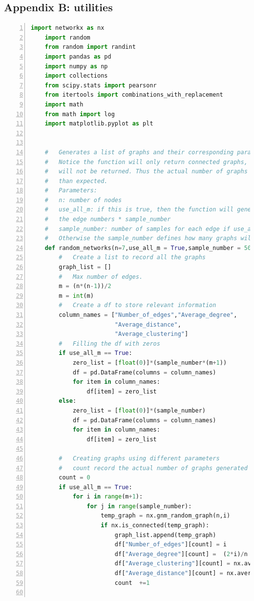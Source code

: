 \documentclass[12pt]{article}
\begin{document}
\subsection{Appendix B: utilities}
\begin{lstlisting}[numbers=left,language=Python,breaklines=true]
    import networkx as nx
    import random
    from random import randint
    import pandas as pd
    import numpy as np
    import collections
    from scipy.stats import pearsonr
    from itertools import combinations_with_replacement
    import math
    from math import log
    import matplotlib.pyplot as plt
    
    
    #   Generates a list of graphs and their corresponding parameter.
    #   Notice the function will only return connected graphs, disconnected graphs
    #   will not be returned. Thus the actual number of graphs returned will be less
    #   than expected.
    #   Parameters:
    #   n: number of nodes
    #   use_all_m: if this is true, then the function will generates samples using all
    #   the edge numbers * sample_number
    #   sample_number: number of samples for each edge if use_all_m = True
    #   Otherwise the sample_number defines how many graphs will be returned in total
    def random_networks(n=7,use_all_m = True,sample_number = 50):
        #   Create a list to record all the graphs
        graph_list = []
        #   Max number of edges.
        m = (n*(n-1))/2
        m = int(m)
        #   Create a df to store relevant information
        column_names = ["Number_of_edges","Average_degree",
                        "Average_distance",
                        "Average_clustering"]
        #   Filling the df with zeros
        if use_all_m == True:
            zero_list = [float(0)]*(sample_number*(m+1))
            df = pd.DataFrame(columns = column_names)
            for item in column_names:
                df[item] = zero_list 
        else:
            zero_list = [float(0)]*(sample_number)
            df = pd.DataFrame(columns = column_names)
            for item in column_names:
                df[item] = zero_list 
        
        #   Creating graphs using different parameters
        #   count record the actual number of graphs generated by the function
        count = 0
        if use_all_m == True:
            for i in range(m+1):
                for j in range(sample_number):
                    temp_graph = nx.gnm_random_graph(n,i)
                    if nx.is_connected(temp_graph):
                        graph_list.append(temp_graph)
                        df["Number_of_edges"][count] = i
                        df["Average_degree"][count] =  (2*i)/n
                        df["Average_clustering"][count] = nx.average_clustering(temp_graph)
                        df["Average_distance"][count] = nx.average_shortest_path_length(temp_graph)
                        count  +=1
    

\end{lstlisting}
\end{document}

